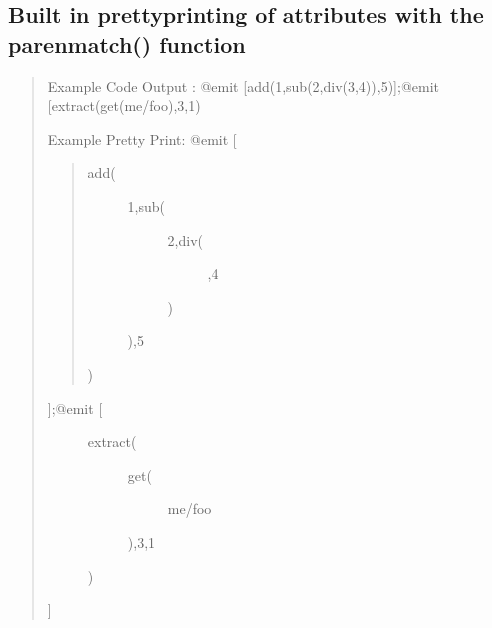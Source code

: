 \documentclass[letterpaper,10pt,english]{sphinxmanual}
\begin{document}
\subsection{Built in pretty\sphinxhyphen{}printing of attributes with the parenmatch() function}
\label{\detokenize{features:built-in-pretty-printing-of-attributes-with-the-parenmatch-function}}\begin{quote}

\sphinxAtStartPar
Example Code Output :
@emit {[}add(1,sub(2,div(3,4)),5){]};@emit {[}extract(get(me/foo),3,1)

\sphinxAtStartPar
Example Pretty Print:
@emit {[}
\begin{quote}
\begin{description}
\item[{add(}] \leavevmode\begin{description}
\item[{1,sub(}] \leavevmode\begin{description}
\item[{2,div(}] \leavevmode
{},4

\end{description}

\sphinxAtStartPar
)

\end{description}

\sphinxAtStartPar
),5

\end{description}

\sphinxAtStartPar
)
\end{quote}
\begin{description}
\item[{{]};@emit {[}}] \leavevmode\begin{description}
\item[{extract(}] \leavevmode\begin{description}
\item[{get(}] \leavevmode
\sphinxAtStartPar
me/foo

\end{description}

\sphinxAtStartPar
),3,1

\end{description}

\sphinxAtStartPar
)

\end{description}

\sphinxAtStartPar
{]}
\end{quote}
\end{document}
